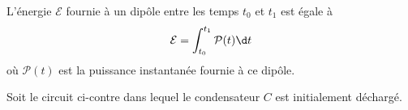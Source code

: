 \finEntrainement








\newpage





\medskip

\begin{prerequis}
L'énergie $\mathcal{E}$ fournie à un dipôle entre les temps $t_0$ et $t_1$ est égale à
\[
\mathcal{E}
=
\int_{t_0}^{t_1} \mathcal{P}(t)\d t
\]
où $\mathcal{P}(t)$ est la puissance  instantanée fournie à ce dipôle.
\end{prerequis}





\hauteurLargeurCadreReponse		{8mm}{4cm}
\typeEntrainement				{} %
\initialisationEntrainement



                                \initialisationPartieGauche %
Soit le circuit ci-contre dans lequel le condensateur $C$ est initialement déchargé. 

